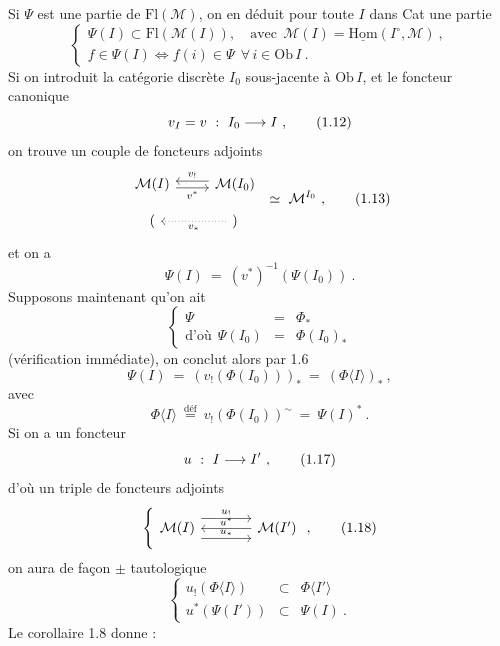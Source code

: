 Si $\Psi$ est une partie de $\mathrm{Fl}(\mathcal{M})$, on en déduit pour toute $I$ dans Cat une partie
\[
\left\{
\begin{array}{l}
\Psi(I) \subset \mathrm{Fl}(\mathcal{M}(I)), \quad \text{avec}\ \ \mathcal{M}(I) = \underline{\mathrm{Hom}}(I^{\circ}, \mathcal{M})\ , \\[1ex]
f \in \Psi(I) \iff f(i) \in \Psi \ \ \forall\, i \in \mathrm{Ob}\, I\ .
\end{array}
\right.
\tag*{(1.11)}
\]
Si on introduit la catégorie discrète $I_0$ sous-jacente à $\mathrm{Ob}\, I$, et le foncteur canonique
\[
v_I = v \ :\ I_0 \fl I\ , \tag*{(1.12)}
\]
on trouve un couple de foncteurs adjoints
\[
\begin{tikzcd}[row sep=small]
\mathcal{M}(I) \arrow[r, shift right=1, "v^{*}"'] & \mathcal{M}(I_0) \arrow[l, shift right=1, "v_{!}"'] \\
( & ) \arrow[l, dotted, "v_{*}"]
\end{tikzcd}
\ \simeq\ \mathcal{M}^{I_0}\ ,
\tag*{(1.13)}
\]
et on a
\[
\Psi(I) \ =\ (v^{*})^{-1}(\Psi(I_0))\ .
\]
Supposons maintenant qu'on ait
\[
\left\{
\begin{array}{rcl}
\Psi & = & \Phi_{*} \\[1ex]
\text{d'où}\ \ \Psi(I_0) & = & \Phi(I_0)_{*}
\end{array}
\right.
\tag*{(1.14)}
\]
(vérification immédiate), on conclut alors par 1.6
\[
\Psi(I) \ =\ (v_{!}(\Phi(I_0)))_{*} \ =\ (\Phi\langle I\rangle)_{*}\ , \tag*{(1.15)}
\]
avec
\[
\Phi\langle I\rangle \ \overset{\text{déf}}{=}\ v_{!}(\Phi(I_0))^{\sim} \ =\ \Psi(I)^{*}\ . \tag*{(1.16)}
\]
Si on a un foncteur
\[
u \ :\ I \fl I'\ , \tag*{(1.17)}
\]
d'où un triple de foncteurs adjoints
\[
\left\{
\begin{tikzcd}[column sep=large]
\mathcal{M}(I) \arrow[r, shift left=3, "u_{!}"] \arrow[r, shift right=3, "u_{*}"] & \mathcal{M}(I') \arrow[l, "u^{*}"']
\end{tikzcd}
\right.
,
\tag*{(1.18)}
\]
on aura de façon $\pm$ tautologique
\[
\left\{
\begin{array}{rcl}
u_{!}(\Phi\langle I\rangle) & \subset & \Phi\langle I'\rangle \\
u^{*}(\Psi(I')) & \subset & \Psi(I)\ .
\end{array}
\right.
\tag*{(1.19)}
\]
Le corollaire 1.8 donne :

